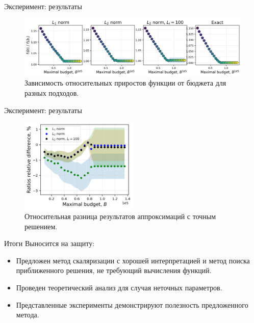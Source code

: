 \documentclass{beamer}
\begin{document}
\begin{frame}{Эксперимент: результаты}

    \begin{figure}
    \centering
    \includegraphics[width=\textwidth]{figures/simplest/relations.png}
                \caption{Зависимость относительных приростов функции от бюджета для разных подходов.}
        \label{fig:enter-label}
    \end{figure}
    
\end{frame}

\begin{frame}{Эксперимент: результаты}
    \begin{figure}
        \centering
        \includegraphics[width=0.5\textwidth]{figures/simplest/relative_difference.png}
        \caption{Относительная разница результатов аппроксимаций с точным решением.}
        \label{fig:enter-label}
    \end{figure}
    
\end{frame}

\begin{frame}{Итоги}
    Выносится на защиту:
    \begin{itemize}
        \item Предложен метод скаляризации с хорошей интерпретацией и метод поиска приближенного решения, не требующий вычисления функций.
        \item Проведен теоретический анализ для случая неточных параметров.
        \item Представленные эксперименты демонстрируют полезность предложенного метода.
    \end{itemize}
\end{frame}
\end{document}
